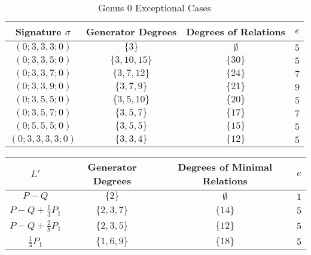 \documentclass[landscape, a0, largefonts]{sciposter}
\theoremstyle{plain}
\theoremstyle{definition}
\theoremstyle{remark}
\newcommand{\halfcan}{L}
\begin{document}
\begin{multicols}{3}
\begin{table}
\captionsetup{type=figure}
\begin{center}
\begin{tabular}
	{| c || c | c | c |}
	\hline
	Signature $\sigma$ & Generator Degrees & Degrees of Relations & $e$ \\
	\hline
	\hline

	$(0; 3, 3, 3; 0)$ & $\{3\}$ & $\emptyset$ & $5$ \\	\hline

	$(0; 3, 3, 5; 0)$ & $\{3, 10, 15\}$ & $\{30\}$ & $5$ \\	\hline
	
	$(0; 3, 3, 7; 0)$ & $\{3, 7, 12\}$ & $\{24\}$ & $7$ \\	\hline
	
	$(0; 3, 3, 9; 0)$ & $\{3, 7, 9\}$ & $\{21\}$ & $9$ \\	\hline
	
	$(0; 3, 5, 5; 0)$ & $\{3, 5, 10\}$ & $\{20\}$ & $5$ \\	\hline
	
	$(0; 3, 5, 7; 0)$ & $\{3, 5, 7\}$ & $\{17\}$ & $7$ \\	\hline
	
	$(0; 5, 5, 5; 0)$ & $\{3, 5, 5\}$ & $\{15\}$ & $5$ \\	\hline
	
	$(0; 3, 3, 3, 3; 0)$ & $\{3, 3, 4\}$ & $\{12\}$ & $5$ \\	\hline
\end{tabular}
\end{center}
\caption{Genus 0 Exceptional Cases}
\label{table:g-0-exceptional}
\end{table}



\begin{table}	
\captionsetup{type=figure}
\begin{center}
\begin{tabular}
{| c || c | c | c |}
	\hline
	$\halfcan'$ & Generator Degrees & Degrees of Minimal Relations & $e$ \\
	\hline
	\hline
	$P - Q$ & $\{2\}$ & $\emptyset$ & $1$\\	\hline

	$P - Q + \frac{1}{3} P_1$ & $\{2, 3, 7\}$ & $\{14\}$ & $5$ \\	\hline

	$P - Q + \frac{2}{5} P_1$ & $\{2, 3, 5\}$ & $\{12\}$ & $5$\\	\hline
	
	$\frac{1}{3} P_1$ & $\{1, 6, 9\}$ & $\{18\}$ & $5$ \\	\hline


\end{tabular}
\end{center}
\end{table}
\end{multicols}
\end{document}
